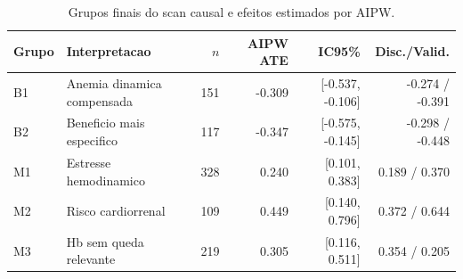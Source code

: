 \begin{table}[htbp]
\centering
\small
\caption{Grupos finais do scan causal e efeitos estimados por AIPW.}
\label{tab:final_causal_groups}
\begin{tabular}{llrrrr}
\toprule
Grupo & Interpretacao & $n$ & AIPW ATE & IC95\% & Disc./Valid. \\
\midrule
B1 & Anemia dinamica compensada & 151 & -0.309 & [-0.537, -0.106] & -0.274 / -0.391 \\
B2 & Beneficio mais especifico & 117 & -0.347 & [-0.575, -0.145] & -0.298 / -0.448 \\
M1 & Estresse hemodinamico & 328 & 0.240 & [0.101, 0.383] & 0.189 / 0.370 \\
M2 & Risco cardiorrenal & 109 & 0.449 & [0.140, 0.796] & 0.372 / 0.644 \\
M3 & Hb sem queda relevante & 219 & 0.305 & [0.116, 0.511] & 0.354 / 0.205 \\
\bottomrule
\end{tabular}
\end{table}
